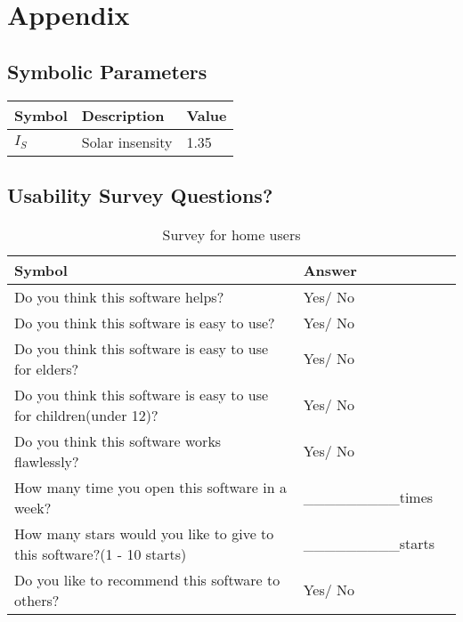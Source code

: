 \documentclass[12pt, titlepage]{article}
\begin{document}
\newpage

\section{Appendix}


\subsection{Symbolic Parameters}

  \noindent \begin{tabular}{l l l} 
    \toprule		
    \textbf{Symbol} & \textbf{Description} & \textbf{Value}\\
    \midrule 
    $I_{S}$ & Solar insensity &1.35  \\
    \bottomrule
  \end{tabular}


 \subsection{Usability Survey Questions?}


\begin{table}[h!]
  \noindent \begin{tabular}{l l l} 
    \toprule		
    \textbf{Symbol} & \textbf{Answer} \\
    \midrule 
    Do you think this software helps? & Yes/ No  \\
    Do you think this software is easy to use? & Yes/ No  \\
    Do you think this software is easy to use for elders? & Yes/ No  \\
    Do you think this software is easy to use for children(under 12)? & Yes/ No  \\
    Do you think this software works flawlessly? & Yes/ No  \\
    How many time you open this software in a week? & \_\_\_\_\_\_\_\_\_times  \\
	 How many stars  would you like to give to this software?(1 - 10 starts) & \_\_\_\_\_\_\_\_\_starts  \\
    Do you like to recommend  this software to others? & Yes/ No  \\
    \bottomrule
  \end{tabular}
  \caption{Survey for home users}
\end{table}
\end{document}
